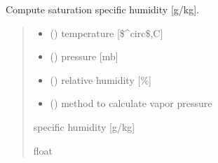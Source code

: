 \documentclass[letterpaper,10pt,english]{sphinxmanual}
\begin{document}

\begin{fulllineitems}
\label{\detokenize{users_guide:hum_subs.qsat_air}}
\pysigstartsignatures
{}
\pysigstopsignatures
\sphinxAtStartPar
Compute saturation specific humidity {[}g/kg{]}.
\begin{quote}\begin{description}
\begin{itemize}
\item {} 
\sphinxAtStartPar
{} () \textendash{} temperature {[}\$\textasciicircum{}circ\$,C{]}

\item {} 
\sphinxAtStartPar
{} () \textendash{} pressure {[}mb{]}

\item {} 
\sphinxAtStartPar
{} () \textendash{} relative humidity {[}\%{]}

\item {} 
\sphinxAtStartPar
{} () \textendash{} method to calculate vapor pressure

\end{itemize}

\sphinxAtStartPar
{} \textendash{} specific humidity {[}g/kg{]}

\sphinxAtStartPar
float

\end{description}\end{quote}

\end{fulllineitems}

\end{document}
